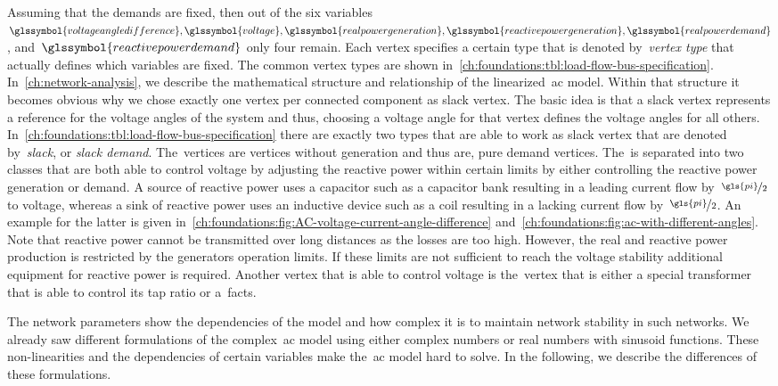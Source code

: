 Assuming that the demands are fixed, then out of the six variables~$
\glssymbol{voltageangledifference},\glssymbol{voltage}, 
\glssymbol{realpowergeneration}, \glssymbol{reactivepowergeneration},
\glssymbol{realpowerdemand}$, and~$\glssymbol{reactivepowerdemand}$ only four
remain. Each vertex specifies a certain type that is denoted by~\emph{vertex
type} that actually defines which variables are fixed. The common vertex types
are shown in~\cref{ch:foundations:tbl:load-flow-bus-specification}.
In~\cref{ch:network-analysis}, we describe the mathematical structure and
relationship of the linearized~\gls{ac} model. Within that structure it becomes
obvious why we chose exactly one vertex per connected component as slack vertex.
The basic idea is that a slack vertex represents a reference for the voltage
angles of the system and thus, choosing a voltage angle for that vertex defines
the voltage angles for all others.
In~\cref{ch:foundations:tbl:load-flow-bus-specification} there are exactly two
types that are able to work as slack vertex that are denoted by~\emph{slack}, or
\emph{slack demand}. The~\pqbus vertices are vertices without generation and
thus are, pure demand vertices. The~\pvbus is separated into two classes that
are both able to control voltage by adjusting the reactive power within certain
limits by either controlling the reactive power generation or demand. A source
of reactive power uses a capacitor such as a capacitor bank resulting in a
leading current flow by~$\nicefrac{\gls{pi}}{2}$ to voltage, whereas a sink of
reactive power uses an inductive device such as a coil resulting in a lacking
current flow by~$\nicefrac{\gls{pi}}{2}$. An example for the latter is given
in~\cref{ch:foundations:fig:AC-voltage-current-angle-difference}
and~\cref{ch:foundations:fig:ac-with-different-angles}. Note that reactive power
cannot be transmitted over long distances as the losses are too high. However,
the real and reactive power production is restricted by the generators operation
limits. If these limits are not sufficient to reach the voltage stability
additional equipment for reactive power is required. Another vertex that is able
to control voltage is the~\cvbus vertex that is either a special transformer
that is able to control its tap ratio or a~\gls{facts}.

The network parameters show the dependencies of the model and how complex it is
to maintain network stability in such networks. We already saw different
formulations of the complex~\gls{ac} model using either complex numbers or real
numbers with sinusoid functions. These non-linearities and the dependencies of
certain variables make the~\gls{ac} model hard to solve. In the following, we
describe the differences of these formulations.
% 
